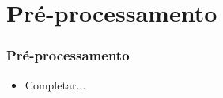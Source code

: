 \section[Pré-processamento]{Pré-processamento}

\begin{frame}
  \frametitle{Pré-processamento}
  \begin{itemize}
    \item Completar...
  \end{itemize}
\end{frame}